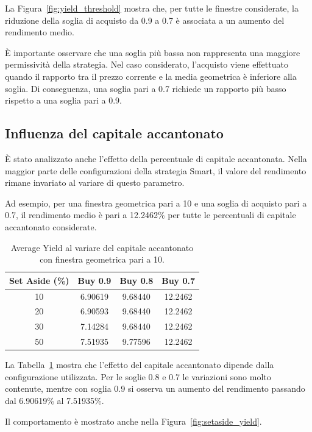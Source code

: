 \documentclass[12pt,a4paper,oneside]{report}
\begin{document}
La Figura~\ref{fig:yield_threshold} mostra che, per tutte le finestre
considerate, la riduzione della soglia di acquisto da 0.9 a 0.7 è associata
a un aumento del rendimento medio.

È importante osservare che una soglia più bassa non rappresenta una maggiore
permissività della strategia. Nel caso considerato, l'acquisto viene
effettuato quando il rapporto tra il prezzo corrente e la media geometrica è
inferiore alla soglia. Di conseguenza, una soglia pari a 0.7 richiede un
rapporto più basso rispetto a una soglia pari a 0.9.

\subsection{Influenza del capitale accantonato}

È stato analizzato anche l'effetto della percentuale di capitale accantonata.
Nella maggior parte delle configurazioni della strategia Smart, il valore
del rendimento rimane invariato al variare di questo parametro.

Ad esempio, per una finestra geometrica pari a 10 e una soglia di acquisto
pari a 0.7, il rendimento medio è pari a 12.2462\% per tutte le percentuali
di capitale accantonato considerate.

\begin{table}[ht]
\centering
\caption{Average Yield al variare del capitale accantonato con finestra
geometrica pari a 10.}
\label{tab:setaside_window10}
\begin{tabular}{c|c|c|c}
\hline
\textbf{Set Aside (\%)} &
\textbf{Buy 0.9} &
\textbf{Buy 0.8} &
\textbf{Buy 0.7} \\
\hline
10 & 6.90619 & 9.68440 & 12.2462 \\
20 & 6.90593 & 9.68440 & 12.2462 \\
30 & 7.14284 & 9.68440 & 12.2462 \\
50 & 7.51935 & 9.77596 & 12.2462 \\
\hline
\end{tabular}
\end{table}

La Tabella~\ref{tab:setaside_window10} mostra che l'effetto del capitale
accantonato dipende dalla configurazione utilizzata. Per le soglie 0.8 e
0.7 le variazioni sono molto contenute, mentre con soglia 0.9 si osserva un
aumento del rendimento passando dal 6.90619\% al 7.51935\%.

Il comportamento è mostrato anche nella Figura~\ref{fig:setaside_yield}.
\end{document}
